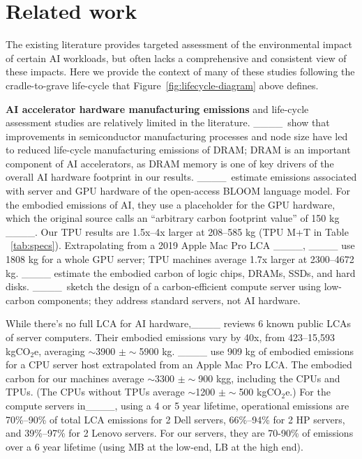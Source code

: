 \section{Related work}
\label{section:related}
The existing literature provides targeted assessment of the environmental impact of certain AI workloads, but often lacks a comprehensive and consistent view of these impacts. Here we provide the context of many of these studies following the cradle-to-grave life-cycle that Figure~\ref{fig:lifecycle-diagram} above defines.

\textbf{AI accelerator hardware manufacturing emissions} and life-cycle assessment studies are relatively limited in the literature. ____~show that improvements in semiconductor manufacturing processes and node size have led to reduced life-cycle manufacturing emissions of DRAM; DRAM is an important component of AI accelerators,  as DRAM memory is one of key drivers of the overall AI hardware footprint in our results. ____~estimate emissions associated with server and GPU hardware of the open-access BLOOM language model. For the embodied emissions of AI, they use a placeholder for the GPU hardware, which the original source calls an ``arbitrary carbon footprint value'' of 150 kg ____.  Our TPU results are 1.5x--4x larger at 208--585 kg (TPU M+T in Table ~\ref{tab:specs}). Extrapolating from a 2019 Apple Mac Pro LCA ____, ____ use 1808 kg for a whole GPU server; TPU machines average 1.7x larger at 2300--4672 kg.
____ estimate the embodied carbon of logic chips, DRAMs, SSDs, and hard disks.
____~sketch the design of a carbon-efficient compute server using low-carbon components; they address standard servers, not AI hardware. 

While there's no full LCA for AI hardware,____ reviews 6 known public LCAs of server computers. Their embodied emissions vary by 40x, from 423–15,593 kgCO$_{2}$e, averaging $\sim$3900 $\pm \sim$5900 kg. ____ use 909 kg of embodied emissions for a CPU server host extrapolated from an Apple Mac Pro LCA. The embodied carbon for our machines average $\sim$3300 $\pm \sim$900 kgg, including the CPUs and TPUs. (The CPUs without TPUs average $\sim$1200 $\pm \sim$500 kgCO$_{2}$e.) For the compute servers in____, using a 4 or 5 year lifetime, operational emissions are 70\%–90\% of total LCA emissions for 2 Dell servers, 66\%–94\% for 2 HP servers, and 39\%–97\% for 2 Lenovo servers. For our servers, they are 70-90\% of emissions over a 6 year lifetime (using MB at the low-end, LB at the high end).

